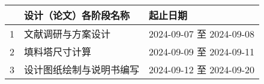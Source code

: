 \begin{taskbook}
	
	
	\taskitem
	\begin{table}[H]
		\centering
		\begin{tabularx}{.95\textwidth}{p{1.5em}|X|p{6em}}
			\hline
			& 设计（论文）各阶段名称 &	起止日期\\
			\hline
			1 & 文献调研与方案设计 &	2024-09-07 至 2024-09-08\\
			\hline
			2	& 填料塔尺寸计算 &	2024-09-09 至 2024-09-11\\
			\hline
			3 & 设计图纸绘制与说明书编写 & 2024-09-12 至 2024-09-20\\
			\hline
		\end{tabularx}
	\end{table}	
\end{taskbook}